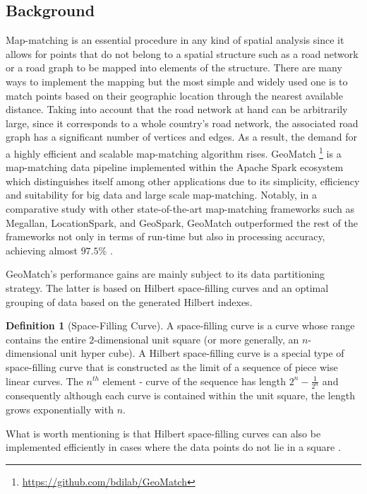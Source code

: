\documentclass[12pt]{article}
\theoremstyle{definition}
\newtheorem{definition}{Definition}[section]
\begin{document}
\subsection{Background}
Map-matching is an essential procedure in any kind of spatial analysis since it allows for points that do not belong to a spatial structure such as a road network or a road graph to be mapped into elements of the structure. There are many ways to implement the mapping but the most simple and widely used one is to match points based on their geographic location through the nearest available distance. Taking into account that the road network at hand can be arbitrarily large, since it corresponds to a whole country's road network, the associated road graph has a significant number of vertices and edges. As a result, the demand for a highly efficient and scalable map-matching algorithm rises. GeoMatch \footnote{\url{https://github.com/bdilab/GeoMatch}} is a map-matching data pipeline implemented within the Apache Spark ecosystem which distinguishes itself among other applications due to its simplicity, efficiency and suitability for big data and large scale map-matching. Notably, in a comparative study with other state-of-the-art map-matching frameworks such as Megallan, LocationSpark, and GeoSpark, GeoMatch outperformed the rest of the frameworks not only in terms of run-time but also in processing accuracy, achieving almost $97.5\%$ \cite{GeoMatch}.

GeoMatch's performance gains are mainly subject to its data partitioning strategy. The latter is based on Hilbert space-filling curves and an optimal grouping of data based on the generated Hilbert indexes. 

\begin{definition}[Space-Filling Curve]
    A space-filling curve is a curve whose range contains the entire $2$-dimensional unit square (or more generally, an $n$-dimensional unit hyper cube). A Hilbert space-filling curve is a special type of space-filling curve that is constructed as the limit of a sequence of piece wise linear curves. The $n^{th}$ element - curve of the sequence has length $2^n-\frac{1}{2^n}$ and consequently although each curve is contained within the unit square, the length grows exponentially with $n$. 
\end{definition} 

What is worth mentioning is that Hilbert space-filling curves can also be implemented efficiently in cases where the data points do not lie in a square \cite{HilbertNonSquare}. 
\end{document}
